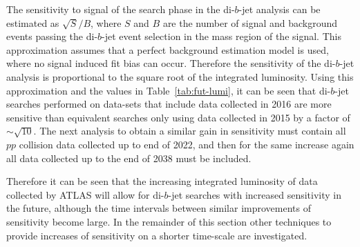 The sensitivity to signal of the search phase in the di-$b$-jet analysis can be estimated as $\sqrt{S}/B$,
where $S$ and $B$ are the number of signal and background events passing the di-$b$-jet event selection in the mass region of the signal.
This approximation assumes that a perfect background estimation model is used, where no signal induced fit bias can occur.
Therefore the sensitivity of the di-$b$-jet analysis is proportional to the square root of the integrated luminosity.
Using this approximation and the values in Table~\ref{tab:fut-lumi}, it can be seen that di-$b$-jet searches performed on data-sets that include data collected in 2016
are more sensitive than equivalent searches only using data collected in 2015 by a factor of $\sim\sqrt{10}$.
The next analysis to obtain a similar gain in sensitivity must contain all $pp$ collision data collected up to end of 2022,
and then for the same increase again all data collected up to the end of 2038 must be included.

Therefore it can be seen that the increasing integrated luminosity of data collected by ATLAS will
allow for di-$b$-jet searches with increased sensitivity in the future,
although the time intervals between similar improvements of sensitivity become large.
In the remainder of this section other techniques to provide increases of sensitivity on a shorter time-scale are investigated.


